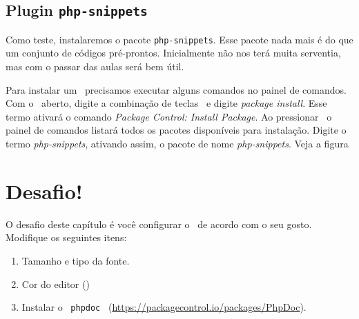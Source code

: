 
\subsection{Plugin \texttt{php-snippets}}
\label{plugin-php-snippets}

Como teste, instalaremos o pacote \texttt{php-snippets}. Esse
pacote nada mais é do que um conjunto de códigos pré-prontos. Inicialmente não
nos terá muita serventia, mas com o passar das aulas será bem útil.

Para instalar um \plugin~precisamos executar alguns comandos no painel de comandos.
Com o \sublime~aberto, digite a combinação de teclas \ctrlshiftp~e digite
\textit{package install}. Esse termo ativará o comando \textit{Package Control: Install Package}.
Ao pressionar \avancar~o painel de comandos listará todos os pacotes disponíveis
para instalação. Digite o termo \textit{php-snippets}, ativando assim, o pacote
de nome \textit{php-snippets}. Veja a figura


\section{Desafio!}
\label{cap2-desafio}
O desafio deste capítulo é você configurar o \sublime~de acordo com o seu gosto.
Modifique os seguintes itens:
\begin{enumerate}
  \item Tamanho e tipo da fonte.
  \item Cor do editor ()
  \item Instalar o \plugin~\texttt{phpdoc}~ (\url{https://packagecontrol.io/packages/PhpDoc}).
\end{enumerate}
